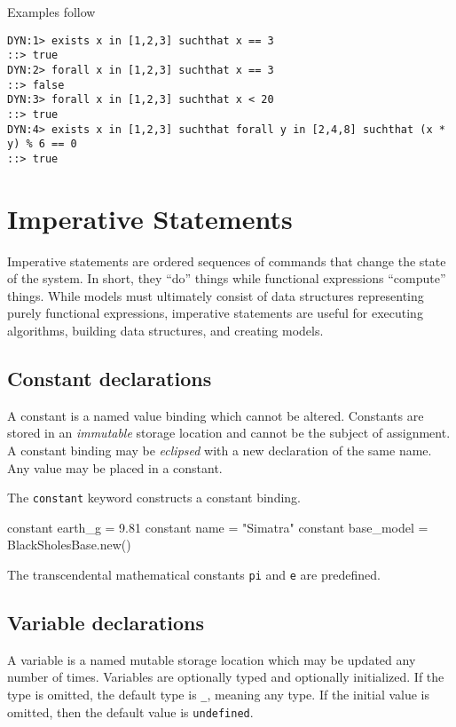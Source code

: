 \documentclass[11pt]{article}
\newcommand{\literal}[1]{\lstinline[style=DSL,identifierstyle=\itshape]!#1!}
\newcommand{\keyword}[1]{\literal{#1}}
\newcommand{\variable}[1]{\literal{#1}}
\begin{document}
Examples follow

\begin{lstlisting}
DYN:1> exists x in [1,2,3] suchthat x == 3
::> true
DYN:2> forall x in [1,2,3] suchthat x == 3
::> false
DYN:3> forall x in [1,2,3] suchthat x < 20
::> true
DYN:4> exists x in [1,2,3] suchthat forall y in [2,4,8] suchthat (x * y) % 6 == 0
::> true
\end{lstlisting}

\newpage
\section {Imperative Statements}

Imperative statements are ordered sequences of commands that change the state of the system.  
In short, they ``do'' things while functional expressions ``compute'' things.  
While models must ultimately consist of data structures representing purely functional expressions, 
imperative statements are useful for executing algorithms, building data structures, and creating models.

\subsection{Constant declarations}
A constant is a named value binding which cannot be altered.
Constants are stored in an \emph{immutable} storage location and cannot be the subject of assignment.
A constant binding may be \emph{eclipsed} with a new declaration of the same name.
Any value may be placed in a constant.

The \keyword{constant} keyword constructs a constant binding.

\begin{dsl}
constant earth_g = 9.81
constant name = "Simatra"
constant base_model = BlackSholesBase.new()
\end{dsl}

The transcendental mathematical constants \variable{pi} and \variable{e} are predefined.

\subsection{Variable declarations}

A variable is a named mutable storage location which may be updated
any number of times.  Variables are optionally typed and optionally
initialized.  If the type is omitted, the default type is \literal{_},
meaning any type.  If the initial value is omitted, then the default
value is \literal{undefined}.
\end{document}
